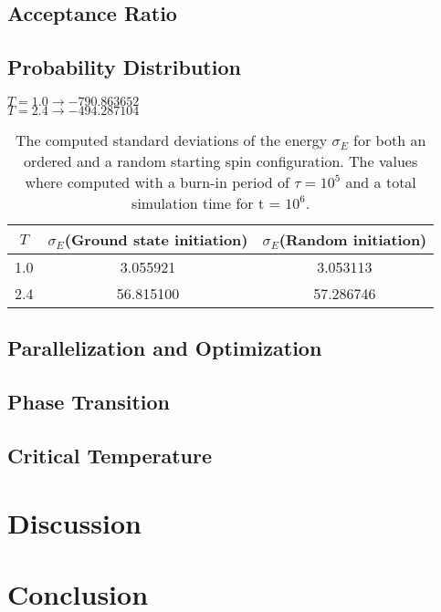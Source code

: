 \documentclass[%
reprint,
nofootinbib,
amsmath,amssymb,
aps,
]{revtex4-1}
\begin{document}
\subsection{Acceptance Ratio} %
\subsection{Probability Distribution} %
$T = 1.0 \rightarrow -790.863652$\\
$T = 2.4 \rightarrow -494.287104$\\

\begin{table}
	\centering
	\caption{The computed standard deviations of the energy $\sigma_E$ for both an ordered and a random starting spin configuration. The values where computed with a burn-in period of $\tau = 10^5$ and a total simulation time for t = $10^6$.}
	\label{tab:table1}
	\begin{tabular}{|c|c|c|}
		\hline
		$T$ & $\sigma_E$(Ground state initiation) & $\sigma_E$(Random initiation)\\
		\hline
		1.0 & 3.055921 &3.053113\\
		2.4 & 56.815100 &57.286746\\
		\hline
	\end{tabular}
\end{table}
\subsection{Parallelization and Optimization} %
\subsection{Phase Transition} %
\subsection{Critical Temperature} %
\section{Discussion} %

\section{Conclusion} %



\end{document}
